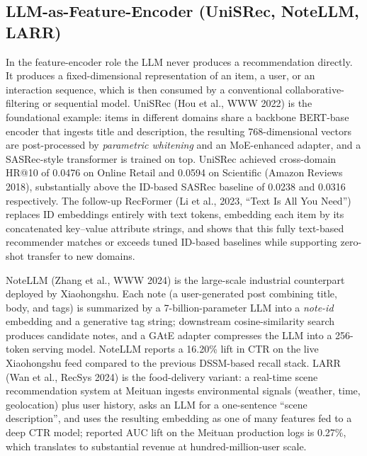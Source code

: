 \subsection{LLM-as-Feature-Encoder (UniSRec, NoteLLM, LARR)}\label{llm-as-feature-encoder-unisrec-notellm-larr}

In the feature-encoder role the LLM never produces a recommendation directly. It produces a fixed-dimensional representation of an item, a user, or an interaction sequence, which is then consumed by a conventional collaborative-filtering or sequential model. UniSRec (Hou et al., WWW 2022) is the foundational example: items in different domains share a backbone BERT-base encoder that ingests title and description, the resulting 768-dimensional vectors are post-processed by \emph{parametric whitening} and an MoE-enhanced adapter, and a SASRec-style transformer is trained on top. UniSRec achieved cross-domain HR@10 of 0.0476 on Online Retail and 0.0594 on Scientific (Amazon Reviews 2018), substantially above the ID-based SASRec baseline of 0.0238 and 0.0316 respectively. The follow-up RecFormer (Li et al., 2023, ``Text Is All You Need'') replaces ID embeddings entirely with text tokens, embedding each item by its concatenated key--value attribute strings, and shows that this fully text-based recommender matches or exceeds tuned ID-based baselines while supporting zero-shot transfer to new domains.

NoteLLM (Zhang et al., WWW 2024) is the large-scale industrial counterpart deployed by Xiaohongshu. Each note (a user-generated post combining title, body, and tags) is summarized by a 7-billion-parameter LLM into a \emph{note-id} embedding and a generative tag string; downstream cosine-similarity search produces candidate notes, and a GAtE adapter compresses the LLM into a 256-token serving model. NoteLLM reports a 16.20\% lift in CTR on the live Xiaohongshu feed compared to the previous DSSM-based recall stack. LARR (Wan et al., RecSys 2024) is the food-delivery variant: a real-time scene recommendation system at Meituan ingests environmental signals (weather, time, geolocation) plus user history, asks an LLM for a one-sentence ``scene description'', and uses the resulting embedding as one of many features fed to a deep CTR model; reported AUC lift on the Meituan production logs is 0.27\%, which translates to substantial revenue at hundred-million-user scale.

